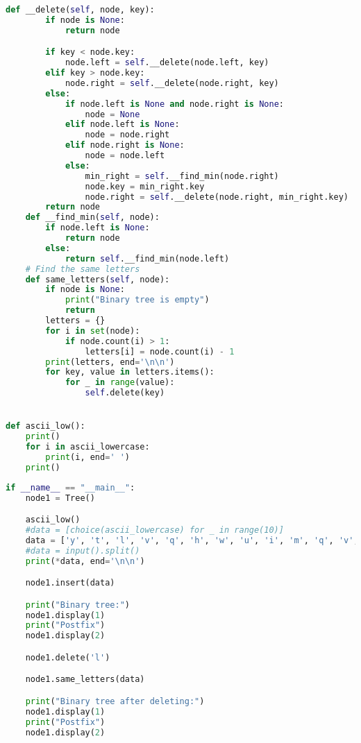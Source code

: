 \documentclass[a4paper,12pt]{article}
\begin{document}
\newpage
    \begin{lstlisting}[language=Python]
    def __delete(self, node, key):
        if node is None:
            return node

        if key < node.key:
            node.left = self.__delete(node.left, key)
        elif key > node.key:
            node.right = self.__delete(node.right, key)
        else:
            if node.left is None and node.right is None:
                node = None
            elif node.left is None:
                node = node.right
            elif node.right is None:
                node = node.left
            else:
                min_right = self.__find_min(node.right)
                node.key = min_right.key
                node.right = self.__delete(node.right, min_right.key)
        return node
    def __find_min(self, node):
        if node.left is None:
            return node
        else:
            return self.__find_min(node.left)
    # Find the same letters
    def same_letters(self, node):
        if node is None:
            print("Binary tree is empty")
            return
        letters = {}
        for i in set(node):
            if node.count(i) > 1:
                letters[i] = node.count(i) - 1
        print(letters, end='\n\n')
        for key, value in letters.items():
            for _ in range(value):
                self.delete(key)


def ascii_low():
    print()
    for i in ascii_lowercase:
        print(i, end=' ')
    print()
    \end{lstlisting}

\newpage
    \begin{lstlisting}[language=Python]
if __name__ == "__main__":
    node1 = Tree()

    ascii_low()
    #data = [choice(ascii_lowercase) for _ in range(10)]
    data = ['y', 't', 'l', 'v', 'q', 'h', 'w', 'u', 'i', 'm', 'q', 'v', 'v', 'r', 'o']
    #data = input().split()
    print(*data, end='\n\n')

    node1.insert(data)

    print("Binary tree:")
    node1.display(1)
    print("Postfix")
    node1.display(2)

    node1.delete('l')

    node1.same_letters(data)

    print("Binary tree after deleting:")
    node1.display(1)
    print("Postfix")
    node1.display(2)
    \end{lstlisting}
\end{document}
